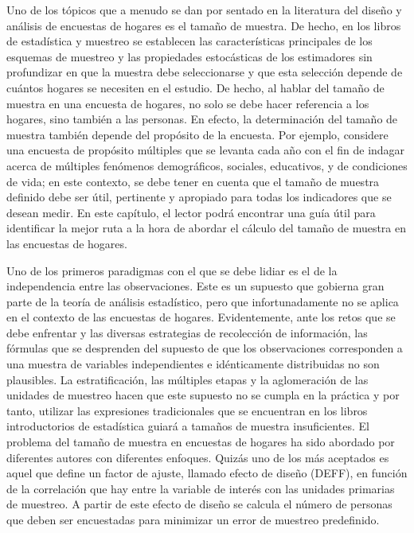 \documentclass[12pt,spanish,]{book}
\begin{document}
Uno de los tópicos que a menudo se dan por sentado en la literatura del diseño y análisis de encuestas de hogares es el tamaño de muestra. De hecho, en los libros de estadística y muestreo se establecen las características principales de los esquemas de muestreo y las propiedades estocásticas de los estimadores sin profundizar en que la muestra debe seleccionarse y que esta selección depende de cuántos hogares se necesiten en el estudio. De hecho, al hablar del tamaño de muestra en una encuesta de hogares, no solo se debe hacer referencia a los hogares, sino también a las personas. En efecto, la determinación del tamaño de muestra también depende del propósito de la encuesta. Por ejemplo, considere una encuesta de propósito múltiples que se levanta cada año con el fin de indagar acerca de múltiples fenómenos demográficos, sociales, educativos, y de condiciones de vida; en este contexto, se debe tener en cuenta que el tamaño de muestra definido debe ser útil, pertinente y apropiado para todas los indicadores que se desean medir. En este capítulo, el lector podrá encontrar una guía útil para identificar la mejor ruta a la hora de abordar el cálculo del tamaño de muestra en las encuestas de hogares.

Uno de los primeros paradigmas con el que se debe lidiar es el de la independencia entre las observaciones. Este es un supuesto que gobierna gran parte de la teoría de análisis estadístico, pero que infortunadamente no se aplica en el contexto de las encuestas de hogares. Evidentemente, ante los retos que se debe enfrentar y las diversas estrategias de recolección de información, las fórmulas que se desprenden del supuesto de que los observaciones corresponden a una muestra de variables independientes e idénticamente distribuidas no son plausibles. La estratificación, las múltiples etapas y la aglomeración de las unidades de muestreo hacen que este supuesto no se cumpla en la práctica y por tanto, utilizar las expresiones tradicionales que se encuentran en los libros introductorios de estadística guiará a tamaños de muestra insuficientes. El problema del tamaño de muestra en encuestas de hogares ha sido abordado por diferentes autores con diferentes enfoques. Quizás uno de los más aceptados es aquel que define un factor de ajuste, llamado efecto de diseño (DEFF), en función de la correlación que hay entre la variable de interés con las unidades primarias de muestreo. A partir de este efecto de diseño se calcula el número de personas que deben ser encuestadas para minimizar un error de muestreo predefinido.
\end{document}
